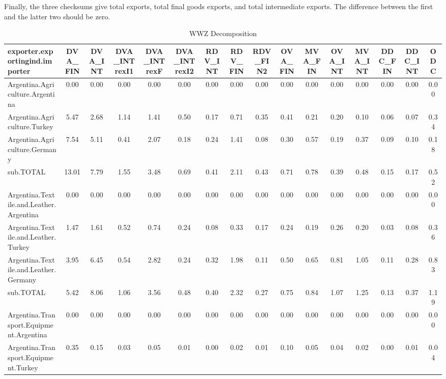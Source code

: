 \documentclass{article}
\begin{document}
Finally, the three checksums give total exports, total final goods exports, and total intermediate exports. The difference between the first and the latter two should be zero.

\begin{landscape}
\begin{table}[htbp]\scriptsize
    \begin{adjustwidth}{-1.15in}{-1.15in}
  \centering
  \caption{WWZ Decomposition}
    \begin{tabular}{lccccccccccccccc}
    \toprule
    exporter.exportingind.importer & DVA\_FIN & DVA\_INT & DVA\_INTrexI1 & DVA\_INTrexF & DVA\_INTrexI2 & RDV\_INT & RDV\_FIN & RDV\_FIN2 & OVA\_FIN & MVA\_FIN & OVA\_INT & MVA\_INT & DDC\_FIN & DDC\_INT & ODC \\
    \midrule
    Argentina.Agriculture.Argentina & 0.00  & 0.00  & 0.00  & 0.00  & 0.00  & 0.00  & 0.00  & 0.00  & 0.00  & 0.00  & 0.00  & 0.00  & 0.00  & 0.00  & 0.00 \\
    Argentina.Agriculture.Turkey & 5.47  & 2.68  & 1.14  & 1.41  & 0.50  & 0.17  & 0.71  & 0.35  & 0.41  & 0.21  & 0.20  & 0.10  & 0.06  & 0.07  & 0.34 \\
    Argentina.Agriculture.Germany & 7.54  & 5.11  & 0.41  & 2.07  & 0.18  & 0.24  & 1.41  & 0.08  & 0.30  & 0.57  & 0.19  & 0.37  & 0.09  & 0.10  & 0.18 \\
    sub.TOTAL & 13.01 & 7.79  & 1.55  & 3.48  & 0.69  & 0.41  & 2.11  & 0.43  & 0.71  & 0.78  & 0.39  & 0.48  & 0.15  & 0.17  & 0.52 \\
    Argentina.Textile.and.Leather.Argentina & 0.00  & 0.00  & 0.00  & 0.00  & 0.00  & 0.00  & 0.00  & 0.00  & 0.00  & 0.00  & 0.00  & 0.00  & 0.00  & 0.00  & 0.00 \\
    Argentina.Textile.and.Leather.Turkey & 1.47  & 1.61  & 0.52  & 0.74  & 0.24  & 0.08  & 0.33  & 0.17  & 0.24  & 0.19  & 0.26  & 0.20  & 0.03  & 0.08  & 0.36 \\
    Argentina.Textile.and.Leather.Germany & 3.95  & 6.45  & 0.54  & 2.82  & 0.24  & 0.32  & 1.98  & 0.11  & 0.50  & 0.65  & 0.81  & 1.05  & 0.11  & 0.28  & 0.83 \\
    sub.TOTAL & 5.42  & 8.06  & 1.06  & 3.56  & 0.48  & 0.40  & 2.32  & 0.27  & 0.75  & 0.84  & 1.07  & 1.25  & 0.13  & 0.37  & 1.19 \\
    Argentina.Transport.Equipment.Argentina & 0.00  & 0.00  & 0.00  & 0.00  & 0.00  & 0.00  & 0.00  & 0.00  & 0.00  & 0.00  & 0.00  & 0.00  & 0.00  & 0.00  & 0.00 \\
    Argentina.Transport.Equipment.Turkey & 0.35  & 0.15  & 0.03  & 0.05  & 0.01  & 0.00  & 0.02  & 0.01  & 0.10  & 0.05  & 0.04  & 0.02  & 0.00  & 0.01  & 0.04 \\

\end{tabular}
\end{adjustwidth}
\end{table}
\end{landscape}
\end{document}
